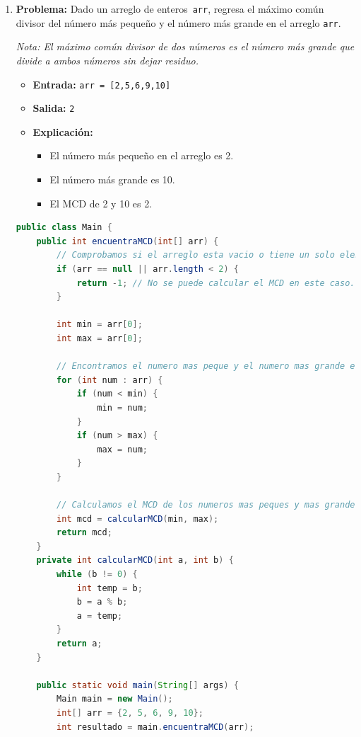 \documentclass{article}
\begin{document}
\begin{enumerate}
\begin{lstlisting}[language=Java]
    \end{lstlisting}

    \newpage

    \item \textbf{Problema:} Dado un arreglo de enteros \texttt{arr}, regresa
    el máximo común divisor del número más pequeño y el número más grande en 
    el arreglo \texttt{arr}.

    \textit{Nota: El máximo común divisor de dos números es el número más
    grande que divide a ambos números sin dejar residuo.}

    \begin{itemize}
        \item \textbf{Entrada:} \texttt{arr = [2,5,6,9,10]}
        \item \textbf{Salida:} \texttt{2}
        \item \textbf{Explicación:} 
        \begin{itemize}
            \item El número más pequeño en el arreglo es 2.
            \item El número más grande es 10.
            \item El MCD de 2 y 10 es 2.
        \end{itemize}
    \end{itemize}
    \begin{lstlisting}[language=Java]
       public class Main {
    public int encuentraMCD(int[] arr) {
        // Comprobamos si el arreglo esta vacio o tiene un solo elemento.
        if (arr == null || arr.length < 2) {
            return -1; // No se puede calcular el MCD en este caso.
        }

        int min = arr[0];
        int max = arr[0];

        // Encontramos el numero mas peque y el numero mas grande en el arreglo.
        for (int num : arr) {
            if (num < min) {
                min = num;
            }
            if (num > max) {
                max = num;
            }
        }

        // Calculamos el MCD de los numeros mas peques y mas grandes
        int mcd = calcularMCD(min, max);
        return mcd;
    }
    private int calcularMCD(int a, int b) {
        while (b != 0) {
            int temp = b;
            b = a % b;
            a = temp;
        }
        return a;
    }

    public static void main(String[] args) {
        Main main = new Main();
        int[] arr = {2, 5, 6, 9, 10};
        int resultado = main.encuentraMCD(arr);


\end{lstlisting}
\end{enumerate}
\end{document}
